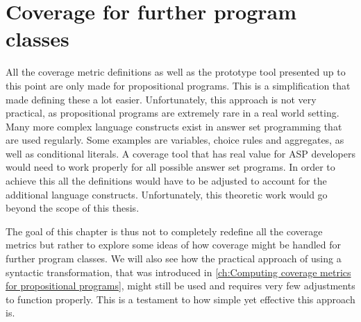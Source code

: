 \begin{comment}
show in general terms:
- how i am using the AST of the program to gather information about rules and (definable) atoms
    - what information is gathered? why? how is it stored? 

- how i am using ProgramBuilders to add new rules to the program using the gathered information (obviously only add what is necessary based on which metric should be computed)
    - how are the rules added? how do i know which rules to add?

- how i read the label atoms from the answer sets and use them to calculate the coverage (plus printing information about covered / not covered elements is possible)
    - how is the program solved? (brave/cautious using clingo...) how do i gather the resulting models/the contained atoms? how do i compute coverage from the gathered atoms?
\end{comment}


\chapter{Coverage for further program classes}
\label{ch:Coverage for further program classes}
All the coverage metric definitions as well as the prototype tool presented up to this point are only made for propositional programs. This is a simplification that made defining these a lot easier. Unfortunately, this approach is not very practical, as propositional programs are extremely rare in a real world setting. Many more complex language constructs exist in answer set programming that are used regularly. Some examples are variables, choice rules and aggregates, as well as conditional literals. A coverage tool that has real value for ASP developers would need to work properly for all possible answer set programs. In order to achieve this all the definitions would have to be adjusted to account for the additional language constructs. Unfortunately, this theoretic work would go beyond the scope of this thesis. 

The goal of this chapter is thus not to completely redefine all the coverage metrics but rather to explore some ideas of how coverage might be handled for further program classes. We will also see how the practical approach of using a syntactic transformation, that was introduced in \cref{ch:Computing coverage metrics for propositional programs}, might still be used and requires very few adjustments to function properly. This is a testament to how simple yet effective this approach is. 


